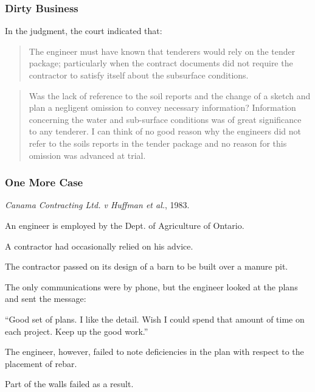 \begin{frame}
\frametitle{Dirty Business}
In the judgment, the court indicated that:

\begin{quote}
   The engineer must have known that tenderers would rely on the tender package; particularly when the contract documents did not require the contractor to satisfy itself about the subsurface conditions.
\end{quote}
\begin{quote}
   Was the lack of reference to the soil reports and the change of a sketch and plan a negligent omission to convey necessary information?  Information concerning the water and sub-surface conditions was of great significance to any tenderer.  I can think of no good reason why the engineers did not refer to the soils reports in the tender package and no reason for this omission was advanced at trial.
\end{quote}


\end{frame}



\begin{frame}
\frametitle{One More Case}

\textit{Canama Contracting Ltd. v Huffman et al.}, 1983.

An engineer is employed by the Dept. of Agriculture of Ontario.

A contractor had occasionally relied on his advice.

The contractor passed on its design of a barn to be built over a manure pit.

The only communications were by phone, but the engineer looked at the plans and sent the message:

	     ``Good set of plans.  I like the detail.  Wish I could spend that 	    amount of time on each project.  Keep up the good work.''


The engineer, however, failed to note deficiencies in the plan with respect to the placement of rebar.

Part of the walls failed as a result.


\end{frame}



